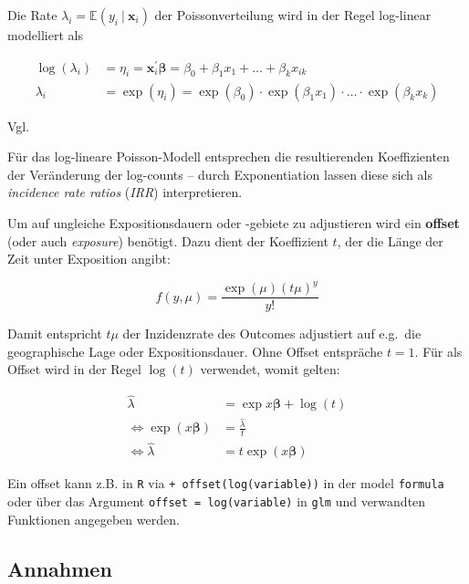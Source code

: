 \documentclass[ngerman,a4paper,]{scrartcl}
\theoremstyle{definition}
\theoremstyle{definition}
\theoremstyle{definition}
\theoremstyle{remark}
\begin{document}
Die Rate \(\lambda_i = \mathbb{E}(y_i\ |\ \mathbf{x}_i)\) der Poissonverteilung wird in der Regel log-linear modelliert als

\begin{align*}
  \log(\lambda_i) &= \eta_i 
    = \mathbf{x}_i^\prime \boldsymbol{\beta} 
    = \beta_0 + \beta_1 x_1 + \ldots + \beta_k x_{ik} \\
  \lambda_i &= \exp(\eta_i) 
    = \exp(\beta_0) \cdot \exp(\beta_1 x_1) \cdot \ldots \cdot \exp(\beta_k x_k)
\end{align*}

Vgl. \citet{fahrmeirRegressionModelleMethoden2009}

Für das log-lineare Poisson-Modell entsprechen die resultierenden Koeffizienten der Veränderung der log-counts -- durch Exponentiation lassen diese sich als \emph{incidence rate ratios} (\emph{IRR}) interpretieren.

Um auf ungleiche Expositionsdauern oder -gebiete zu adjustieren wird ein \textbf{offset} (oder auch \emph{exposure}) benötigt. Dazu dient der Koeffizient \(t\), der die Länge der Zeit unter Exposition angibt:

\begin{equation}
f(y, \mu) = \frac{\exp(\mu) (t \mu)^y}{y!}
\end{equation}

Damit entspricht \(t \mu\) der Inzidenzrate des Outcomes adjustiert auf e.g.~die geographische Lage oder Expositionsdauer. Ohne Offset entspräche \(t = 1\).
Für als Offset wird in der Regel \(\log(t)\) verwendet, womit gelten:

\begin{align*}
\hat{\lambda} &= \exp{x \boldsymbol{\beta} + \log(t)} \\
\Leftrightarrow \exp(x \boldsymbol{\beta}) &= \frac{\hat{\lambda}}{t} \\
\Leftrightarrow \hat{\lambda} &= t \exp(x \boldsymbol{\beta})
\end{align*}

Ein offset kann z.B. in \texttt{R} via \texttt{+\ offset(log(variable))} in der model \texttt{formula} oder über das Argument \texttt{offset\ =\ log(variable)} in \texttt{glm} und verwandten Funktionen angegeben werden.

\hypertarget{annahmen}{%
\subsection{Annahmen}\label{annahmen}}
\end{document}

